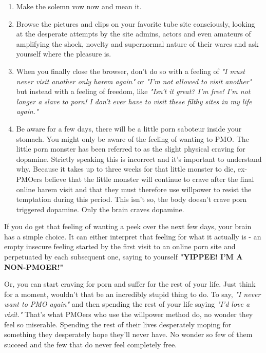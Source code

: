 \documentclass[easypeasy.tex]{subfiles}
\begin{document}
\begin{enumerate}
  \item Make the solemn vow now and mean it.

  \item Browse the pictures and clips on your favorite tube site consciously, looking at the desperate attempts by the site admins, actors and even amateurs of amplifying the shock, novelty and supernormal nature of their wares and ask yourself where the pleasure is.

  \item When you finally close the browser, don't do so with a feeling of \textit{"I must never visit another only harem again"} or \textit{"I'm not allowed to visit another"} but instead with a feeling of freedom, like \textit{"Isn't it great? I'm free! I'm not longer a slave to porn! I don't ever have to visit these filthy sites in my life again."}

  \item Be aware for a few days, there will be a little porn saboteur inside your stomach. You might only be aware of the feeling of wanting to PMO. The little porn monster has been referred to as the slight physical craving for dopamine. Strictly speaking this is incorrect and it's important to understand why. Because it takes up to three weeks for that little monster to die, ex-PMOers believe that the little monster will continue to crave after the final online harem visit and that they must therefore use willpower to resist the temptation during this period. This isn't so, the body doesn't crave porn triggered dopamine. Only the brain craves dopamine.
\end{enumerate}

If you do get that feeling of wanting a peek over the next few days, your brain has a simple choice. It can either interpret that feeling for what it actually is - an empty insecure feeling started by the first visit to an online porn site and perpetuated by each subsequent one, saying to yourself \textbf{"YIPPEE! I'M A NON-PMOER!"}

Or, you can start craving for porn and suffer for the rest of your life. Just think for a moment, wouldn't that be an incredibly stupid thing to do. To say, \textit{"I never want to PMO again"} and then spending the rest of your life saying \textit{"I'd love a visit."} That's what PMOers who use the willpower method do, no wonder they feel so miserable. Spending the rest of their lives desperately moping for something they desperately hope they'll never have. No wonder so few of them succeed and the few that do never feel completely free.
\end{document}
